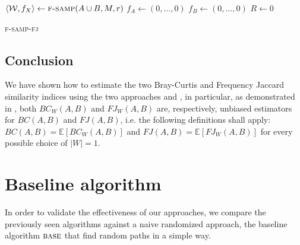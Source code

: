 \begin{algorithm}[h]
	\small
	\DontPrintSemicolon
	$\langle \mathcal{W}, f_X \rangle \gets \textsc{f-samp}(A \cup B, M, r)$ \;
	$f_A \gets (0,\ldots,0)$\;
	$f_B \gets (0,\ldots,0)$\;
	$R \gets 0$\;
	\caption{\textsc{f-samp-fj}}
	\label{alg:f-samp-fj}
\end{algorithm}

\subsection*{Conclusion}
We have shown how to estimate the two Bray-Curtis and Frequency Jaccard similarity indices using the two approaches \fcount and \fsamp, in particular, as demonstrated in \cite{SubSim}, both $BC_{W}(A,B)$ and $FJ_{W}(A,B)$ are, respectively, unbiased estimators for $BC(A,B)$ and $FJ(A,B)$, i.e. the following definitions shall apply: $BC(A,B) = \mathbb{E}[BC_{W}(A,B)]$ and $FJ(A,B) = \mathbb{E}[FJ_{W}(A,B)]$ for every possible choice of $|W| = 1$.

\clearpage

\section{Baseline algorithm}

In order to validate the effectiveness of our approaches, we compare the previously seen algorithms against a naive randomized approach, the baseline algorithm $\textsc{base}$ that find random paths in a simple way.

